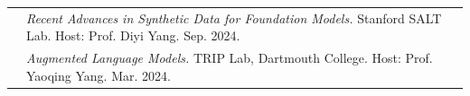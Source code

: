 \begin{longtable}[l]{@{}>{\raggedright\arraybackslash}p{} p{}@{}}
    {[PR1]} & \textit{Recent Advances in Synthetic Data for Foundation Models.} Stanford SALT Lab. Host: Prof. Diyi Yang. Sep. 2024. \\[0.5em]
    {[PR2]} & \textit{Augmented Language Models.} TRIP Lab, Dartmouth College. Host: Prof. Yaoqing Yang. Mar. 2024.
\end{longtable}
